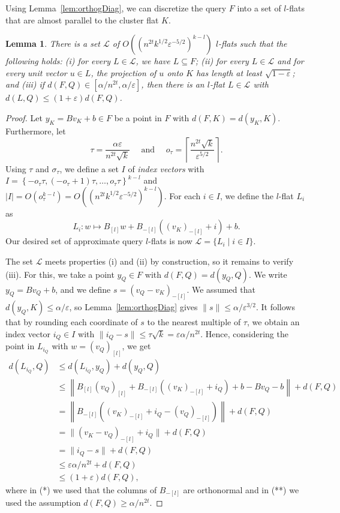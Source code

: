 \documentclass[a4paper,11pt]{paper}
\newcommand{\eps}{\varepsilon}
\newtheorem{lemma}[theorem]{Lemma}
\begin{document}
Using Lemma~\ref{lem:orthogDiag}, we can discretize
the query $F$ into a set of  $l$-flats that are
almost parallel to the cluster flat $K$.
\begin{lemma}\label{lem:tflats}
  There is a set $\mathcal{L}$  of
  $O((n^{2t}k^{1/2}\eps^{-5/2})^{k-l})$
  $l$-flats such
  that the following holds:
  (i) for every $L \in \mathcal{L}$, we have
    $L \subseteq F$;
  (ii) for every $L \in \mathcal{L}$ and for every unit vector
    $u \in L$, the projection
    of $u$ onto $K$ has length at least $\sqrt{1-\eps}$; and
  (iii) if $d(F, Q) \in [\alpha/n^{2t}, \alpha/\eps]$,
  then there is an $l$-flat $L \in \mathcal{L}$ with
  $d(L, Q) \leq (1 + \eps)d(F, Q)$.
\end{lemma}
\begin{proof}
  Let $y_K = Bv_K + b \in F$ be a point in $F$ with
  $d(F, K) = d(y_K, K)$.  Furthermore, let
  \[
    \tau = \frac{\alpha\eps}{n^{2t}\sqrt{k}}
    \quad\text{ and }\quad
    o_\tau = \left\lceil \frac{ n^{2t} \sqrt{k}}{\eps^{5/2}}
    \right\rceil.
  \]
  Using $\tau$ and $\sigma_\tau$, we
  define a set $I$ of \emph{index vectors} with
  $
    I = \left\{-o_\tau \tau, (-o_\tau + 1) \tau, \dots,
    o_\tau \tau \right\}^{k-l}
  $
  and $|I| = O(o_\tau^{k-l}) = O((n^{2t}k^{1/2}\eps^{-5/2})^{k-l})$.
  For each $i \in I$, we define the $l$-flat $L_i$ as
  \[
    L_i: w \mapsto B_{[l]}w + B_{-[l]}\left((v_K)_{-[l]} + i\right)
    + b.
  \]
  Our desired set of approximate query $l$-flats is now $\mathcal{L} = \{L_i \mid
  i \in I\}$.

  The set $\mathcal{L}$ meets properties (i) and (ii)
  by construction, so it remains to verify (iii).
  For this, we take a point $y_Q \in F$ with $d(F, Q) = d(y_Q, Q)$.
  We write $y_Q = Bv_Q + b$,  and we define
  $s = (v_Q - v_K)_{-[l]}$.
  We assumed that
  $d(y_Q, K) \leq \alpha/\eps$,
  so Lemma~\ref{lem:orthogDiag} gives
  $\|s \| \leq \alpha/\eps^{3/2}$.
  It follows that by rounding each coordinate of $s$ to
  the nearest multiple of $\tau$,
  we obtain an index vector $i_Q \in I$ with
  $\| i_Q - s \| \leq \tau\sqrt{k} = \eps\alpha/n^{2t}$.
  Hence, considering the point in $L_{i_Q}$ with $w = (v_Q)_{[l]}$,
  we get
  \begin{align*}
    d(L_{i_Q}, Q) &\leq
    d(L_{i_Q}, y_Q) + d(y_Q, Q)\\
    &\leq  \left\|B_{[l]} (v_Q)_{[l]} +
      B_{-[l]}\left((v_K)_{-[l]}+  i_Q\right) +
      b - Bv_Q - b \right\| + d(F, Q)\\
      &=
      \left\|B_{-[l]}\left((v_K)_{-[l]} + i_Q - (v_Q)_{-[l]}\right)
        \right\| + d(F, Q)\\
      &= \|(v_K - v_Q)_{-[l]} + i_Q\| + d(F, Q)\tag{*}\\
      &= \|i_Q - s\| + d(F, Q)\\
      &\leq \eps\alpha/n^{2t} + d(F, Q)\\
      &\leq (1 + \eps)d(F, Q) \tag{**},
  \end{align*}
  where in (*) we used that the columns of
  $B_{-[l]}$ are orthonormal and in (**) we used the
  assumption $d(F, Q) \geq \alpha/n^{2t}$.
\end{proof}
\end{document}
